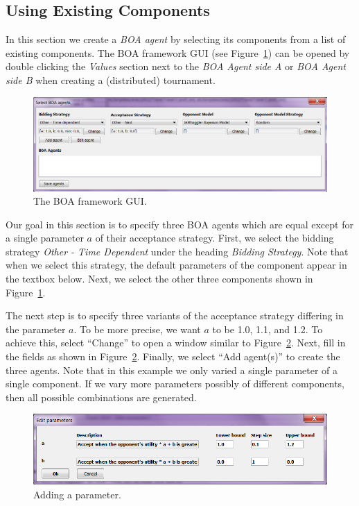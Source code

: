 \documentclass[]{article}
\begin{document}
\subsection{Using Existing Components}
In this section we create a \textit{BOA agent} by selecting its components from a list of existing components. The BOA framework GUI (see Figure~\ref{fig:decoupledGUI}) can be opened by double clicking the \textit{Values} section next to the \textit{BOA Agent side A} or \textit{BOA Agent side B} when creating a (distributed) tournament.

\begin{figure}[h!]
	\center
	\includegraphics[width=15cm]{media/BOAgui.png}
	\caption{The BOA framework GUI.}
	\label{fig:decoupledGUI}
\end{figure}

Our goal in this section is to specify three BOA agents which are equal except for a single parameter $a$ of their acceptance strategy. First, we select the bidding strategy \textit{Other - Time Dependent} under the heading \textit{Bidding Strategy}. Note that when we select this strategy, the default parameters of the component appear in the textbox below. Next, we select the other three components shown in Figure~\ref{fig:decoupledGUI}.

The next step is to specify three variants of the acceptance strategy differing in the parameter $a$. To be more precise, we want $a$ to be 1.0, 1.1, and 1.2. To achieve this, select ``Change'' to open a window similar to Figure~\ref{fig:boaparam}. Next, fill in the fields as shown in Figure~\ref{fig:boaparam}. Finally, we select ``Add agent(s)'' to create the three agents. Note that in this example we only varied a single parameter of a single component. If we vary more parameters possibly of different components, then all possible combinations are generated.

\begin{figure}[h!] 
	\center
	\includegraphics[width=15cm]{media/BOAparam.png}
	\caption{Adding a parameter.}
	\label{fig:boaparam}
\end{figure}
\end{document}
